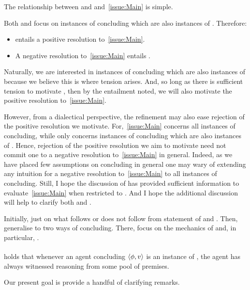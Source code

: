 \begin{note}
  The relationship between \ESU{} and \EAS{} and~\autoref{issue:Main} is simple.

  Both \EAS{} and \ESU{} focus on instances of concluding which are also instances of .
  Therefore:
  \begin{itemize}
  \item
    \EAS{} entails a positive resolution to~\autoref{issue:Main}.
  \item
    A negative resolution to~\autoref{issue:Main} entails \ESU{}.
  \end{itemize}
  Naturally, we are interested in instances of concluding which are also instances of  because we believe this is where tension arises.
  And, so long as there is sufficient tension to motivate \EAS{}, then by the entailment noted, we will also motivate the positive resolution to~\autoref{issue:Main}.

  However, from a dialectical perspective, the refinement may also ease rejection of the positive resolution we motivate.
  For,~\autoref{issue:Main} concerns all instances of concluding, while \ESU{} only concerns instances of concluding which are also instances of \csVImp{}.
  Hence, rejection of the positive resolution we aim to motivate need not commit one to a negative resolution to~\autoref{issue:Main} in general.
  Indeed, as we have placed few assumptions on concluding in general one may wary of extending any intuition for a negative resolution to~\autoref{issue:Main} to all instances of concluding.
  Still, I hope the discussion of  has provided sufficient information to evaluate~\autoref{issue:Main} when restricted to .
  And I hope the additional discussion will help to clarify both \ESU{} and \EAS{}.

  {
    \color{red}
    Initially, just on what follows or does not follow from statement of \ESU{} and \EAS{}.
    Then, generalise to two ways of concluding.
    There, focus on the mechanics of \ESU{} and, in particular, \EAS{}.
  }
\end{note}

\paragraph*{\ESU{}}

\begin{note}
  \ESU{} holds that whenever an agent concluding \(\langle \phi, v \rangle\) is an instance of , the agent has always witnessed reasoning from some pool of premises.

  Our present goal is provide a handful of clarifying remarks.
\end{note}

